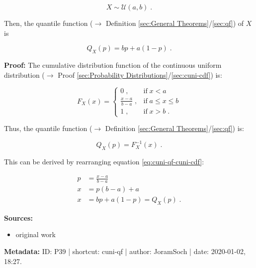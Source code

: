 \documentclass[a4paper,12pt,twoside]{book}
\begin{document}
\begin{equation} \label{eq:cuni-qf-cuni}
X \sim \mathcal{U}(a, b) \; .
\end{equation}

Then, the quantile function ($\rightarrow$ Definition \ref{sec:General Theorems}/\ref{sec:qf}) of $X$ is

\begin{equation} \label{eq:cuni-qf-cuni-qf}
Q_X(p) = bp + a(1-p) \; .
\end{equation}


\vspace{1em}
\textbf{Proof:} The cumulative distribution function of the continuous uniform distribution ($\rightarrow$ Proof \ref{sec:Probability Distributions}/\ref{sec:cuni-cdf}) is:

\begin{equation} \label{eq:cuni-qf-cuni-cdf}
F_X(x) = \left\{
\begin{array}{rl}
0 \; , & \text{if} \; x < a \\
\frac{x-a}{b-a} \; , & \text{if} \; a \leq x \leq b \\
1 \; , & \text{if} \; x > b \; .
\end{array}
\right.
\end{equation}

Thus, the quantile function ($\rightarrow$ Definition \ref{sec:General Theorems}/\ref{sec:qf}) is:

\begin{equation} \label{eq:cuni-qf-cuni-qf-s1}
Q_X(p) = F_X^{-1}(x) \; .
\end{equation}

This can be derived by rearranging equation \eqref{eq:cuni-qf-cuni-cdf}:

\begin{equation} \label{eq:cuni-qf-cuni-cdf-s2}
\begin{split}
p &= \frac{x-a}{b-a} \\
x &= p(b-a) + a \\
x &= bp + a(1-p) = Q_X(p) \; .
\end{split}
\end{equation}


\vspace{1em}
\textbf{Sources:}
\begin{itemize}
\item original work\end{itemize}


\vspace{1em}
\textbf{Metadata:} ID: P39 | shortcut: cuni-qf | author: JoramSoch | date: 2020-01-02, 18:27.
\vspace{1em}
\end{document}
